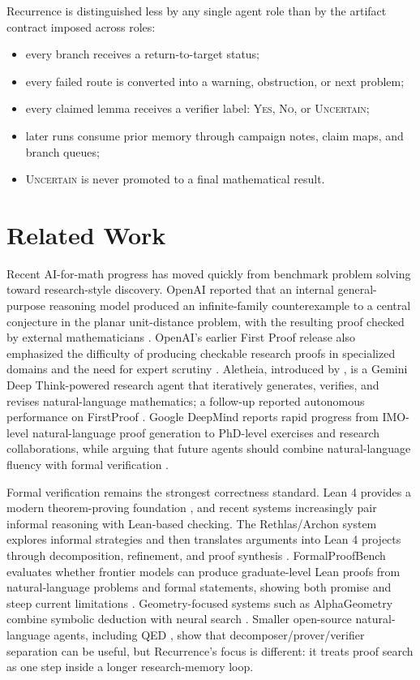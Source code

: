 \documentclass{article}
\theoremstyle{definition}
\theoremstyle{remark}
\begin{document}
Recurrence is distinguished less by any single agent role than by the artifact contract imposed across roles:
\begin{itemize}
  \item every branch receives a return-to-target status;
  \item every failed route is converted into a warning, obstruction, or next problem;
  \item every claimed lemma receives a verifier label: \textsc{Yes}, \textsc{No}, or \textsc{Uncertain};
  \item later runs consume prior memory through campaign notes, claim maps, and branch queues;
  \item \textsc{Uncertain} is never promoted to a final mathematical result.
\end{itemize}

\section{Related Work}

Recent AI-for-math progress has moved quickly from benchmark problem solving toward research-style discovery. OpenAI reported that an internal general-purpose reasoning model produced an infinite-family counterexample to a central conjecture in the planar unit-distance problem, with the resulting proof checked by external mathematicians \citep{openai2026unitdistance}. OpenAI's earlier First Proof release also emphasized the difficulty of producing checkable research proofs in specialized domains and the need for expert scrutiny \citep{openai2026firstproof}. Aletheia, introduced by \citet{feng2026towards}, is a Gemini Deep Think-powered research agent that iteratively generates, verifies, and revises natural-language mathematics; a follow-up reported autonomous performance on FirstProof \citep{feng2026firstproof}. Google DeepMind reports rapid progress from IMO-level natural-language proof generation to PhD-level exercises and research collaborations, while arguing that future agents should combine natural-language fluency with formal verification \citep{deepmind2026geminiscience,deepmind2025imo}.

Formal verification remains the strongest correctness standard. Lean 4 provides a modern theorem-proving foundation \citep{moura2021lean}, and recent systems increasingly pair informal reasoning with Lean-based checking. The Rethlas/Archon system explores informal strategies and then translates arguments into Lean 4 projects through decomposition, refinement, and proof synthesis \citep{ju2026automated}. FormalProofBench evaluates whether frontier models can produce graduate-level Lean proofs from natural-language problems and formal statements, showing both promise and steep current limitations \citep{ravi2026formalproofbench}. Geometry-focused systems such as AlphaGeometry combine symbolic deduction with neural search \citep{trinh2024alphageometry}. Smaller open-source natural-language agents, including QED \citep{an2026qed}, show that decomposer/prover/verifier separation can be useful, but Recurrence's focus is different: it treats proof search as one step inside a longer research-memory loop.
\end{document}
